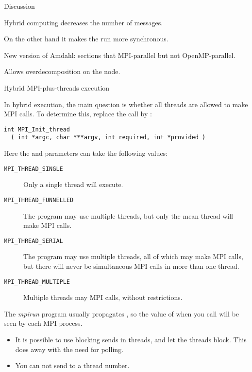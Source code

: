 
 {Discussion}

Hybrid computing decreases the number of messages.

On the other hand it makes the run more synchronous.

New version of Amdahl: sections that MPI-parallel but not OpenMP-parallel.

Allows overdecomposition on the node.

 {Hybrid MPI-plus-threads execution}

In hybrid execution, the main question is whether all threads
are allowed to make MPI calls. To determine this,
replace the  call by
:
\begin{verbatim}
int MPI_Init_thread
  ( int *argc, char ***argv, int required, int *provided )
\end{verbatim}
Here the  and  parameters can take the following
values:
\begin{description}
\item[\texttt{MPI\_THREAD\_SINGLE}] Only a
  single thread will execute.
\item[\texttt{MPI\_THREAD\_FUNNELLED}]
  The program may use multiple threads, but only the mean thread will
  make MPI calls.
\item[\texttt{MPI\_THREAD\_SERIAL}] The
  program may use multiple threads, all of which may make MPI calls,
  but there will never be simultaneous MPI calls in more than one
  thread.
\item[\texttt{MPI\_THREAD\_MULTIPLE}]Multiple
  threads may MPI calls, without restrictions.
\end{description}

The \emph{mpirun}
program usually propagates ,
so the value of  when you call 
will be seen by each MPI process.

\begin{itemize}
\item It is possible to use blocking sends in threads, and let the
  threads block. This does away with the need for polling.
\item You can not send to a thread number.
\end{itemize}
